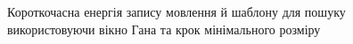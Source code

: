        \begin{figure}[!h]
            \centering

            \caption{Короткочасна енергія запису мовлення й шаблону для пошуку використовуючи вікно Гана та крок
                мінімального розміру}\label{fig:audio-energy-han-min}
        \end{figure}

